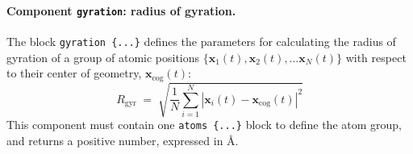 \paragraph*{Component \texttt{gyration}: radius of gyration.}  The
block \texttt{gyration~\{...\}} defines the parameters for
calculating the radius of gyration of a group of atomic positions $\{
\mathbf{x}_1(t), \mathbf{x}_2(t), \ldots \mathbf{x}_N(t) \}$ with
respect to their center of geometry, $\mathbf{x}_{\mathrm{cog}}(t)$:
\begin{equation}
  \label{eq:colvar_gyration}
  R_{\mathrm{gyr}} \; = \; \sqrt{ \frac{1}{N}
    \sum_{i=1}^{N} \left|\mathbf{x}_{i}(t) -
      \mathbf{x}_{\mathrm{cog}}(t)\right|^{2} }
\end{equation}
This component must contain one \texttt{atoms~\{...\}} block to
define the atom group, and returns a positive number, expressed in
\AA{}.




